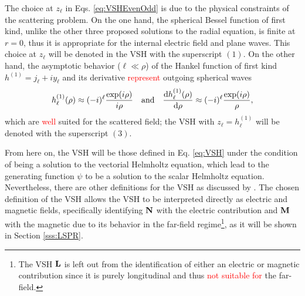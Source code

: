 The choice at $z_\ell$ in Eqs. \eqref{eq:VSHEvenOdd} is due to the physical constraints of the scattering problem. On the one hand, the spherical Bessel function of first kind, unlike the other three proposed solutions to the radial equation, is finite at $r = 0$, thus it is appropriate for the internal electric field and plane waves. This choice at $z_\ell$ will be denoted in the VSH with the superscript $(1)$. On the other hand, the asymptotic behavior ($\ell\ll \rho$) of the Hankel function of first kind $h^{(1)} = j_\ell + i y_\ell$ and its derivative \textcolor{red}{represent} outgoing spherical waves \cite{bohren_absorption_1983}
%
%
%
%
%
\begin{align}
	h_\ell^{(1)}(\rho)\approx (-i)^\ell \frac{\exp(i\rho)}{i\rho}
		\qqtext{and}
	\dv{h_\ell^{(1)}(\rho)}{\rho} \approx (-i)^\ell \frac{\exp(i\rho)}{\rho},
\end{align}
which are \textcolor{red}{well} suited for the scattered field; the VSH with $z_\ell = h^{(1)}_\ell$ will be denoted with the superscript $(3)$.

From here on, the VSH will be those defined in Eq. \eqref{eq:VSH} under the condition of being a solution to the vectorial Helmholtz equation, which lead to the generating function $\psi$ to be a solution to the scalar Helmholtz equation. Nevertheless, there are other definitions for the VSH as discussed by \citeauthor{barrera_vector_1985} \cite{barrera_vector_1985}. The chosen definition of the VSH allows the VSH to be interpreted directly as electric and magnetic fields, specifically identifying $\vb{N}$ with the electric contribution and $\vb{M}$ with the magnetic due to its behavior in the far-field regime\footnote{The VSH $\vb{L}$ is left out from the identification of either an electric or magnetic contribution since it is purely longitudinal and thus \textcolor{red}{not suitable for} the far-field.}, as it will be shown in Section \ref{sss:LSPR}.
